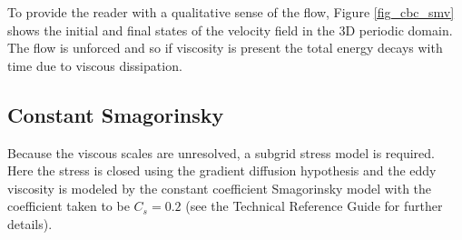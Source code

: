 \documentclass[11pt]{book}
\begin{document}
To provide the reader with a qualitative sense of the flow, Figure \ref{fig_cbc_smv} shows the initial and final states of the velocity field in the 3D periodic domain.  The flow is unforced and so if viscosity is present the total energy decays with time due to viscous dissipation.

\subsection{Constant Smagorinsky}

Because the viscous scales are unresolved, a subgrid stress model is required. Here the stress is closed using the gradient diffusion hypothesis and the eddy viscosity is modeled by the constant coefficient Smagorinsky model with the coefficient taken to be $C_s = 0.2$ (see the Technical Reference Guide for further details).
\end{document}
